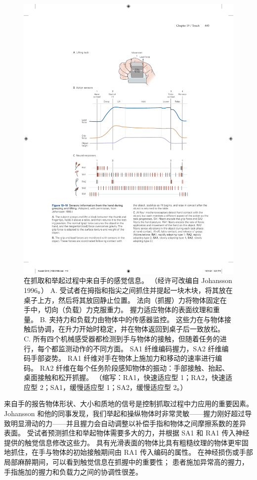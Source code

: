 \begin{figure}[htbp]
	\centering
	\includegraphics[width=1.0\linewidth]{chap19/fig_19_10}
	\caption{在抓取和举起过程中来自手的感觉信息。 （经许可改编自 Johansson 1996。） 
		A. 受试者在拇指和指尖之间抓住并提起一块木块，将其放在桌子上方，然后将其放回静止位置。
		法向（抓握）力将物体固定在手中，切向（负载）力克服重力。
		握力适应物体的表面纹理和重量。
		B. 夹持力和负载力由物体中的传感器监控。
		这些力在与物体接触后协调，在升力开始时稳定，并在物体返回到桌子后一致放松。
		C. 所有四个机械感受器都检测到手与物体的接触，但随着任务的进行，每个都监测动作的不同方面。
		SA1 纤维编码握力，SA2 纤维编码手部姿势。
		RA1 纤维对手在物体上施加力和移动的速率进行编码。
		RA2 纤维在每个任务阶段感知物体的振动：手部接触、抬起、桌面接触和松开抓握。 （缩写：RA1，快速适应型 1；RA2，快速适应型 2；SA1，缓慢适应型 1；SA2，缓慢适应型 2。）}
	\label{fig:19_10}
\end{figure}


来自手的报告物体形状、大小和质地的信号是控制抓取过程中力应用的重要因素。
Johansson 和他的同事发现，我们举起和操纵物体时非常灵敏——握力刚好超过导致明显滑动的力——并且握力会自动调整以补偿手指和物体之间摩擦系数的差异 表面。
受试者预测抓住和举起物体需要多大的力，并根据 SA1 和 RA1 传入神经提供的触觉信息修改这些力。
具有光滑表面的物体比具有粗糙纹理的物体更牢固地抓住，在手与物体的初始接触期间由 RA1 传入编码的属性。
在神经损伤或手部局部麻醉期间，可以看到触觉信息在抓握中的重要性；
患者施加异常高的握力，手指施加的握力和负载力之间的协调性很差。


